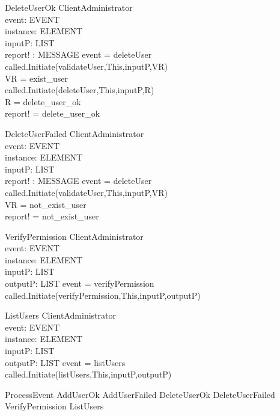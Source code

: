 \begin{schema}{DeleteUserOk}
\Delta ClientAdministrator \\
event: EVENT \\
instance: ELEMENT \\
inputP: LIST \\
report! : MESSAGE
\where event = deleteUser \\
called.Initiate(validateUser,This,inputP,VR) \\
VR = exist\_user \\
called.Initiate(deleteUser,This,inputP,R) \\
R = delete\_user\_ok \\
report! = delete\_user\_ok
\end{schema}

\begin{schema}{DeleteUserFailed}
\Delta ClientAdministrator \\
event: EVENT \\
instance: ELEMENT \\
inputP: LIST \\
report! : MESSAGE
\where event = deleteUser \\
called.Initiate(validateUser,This,inputP,VR) \\
VR = not\_exist\_user \\
report! = not\_exist\_user
\end{schema}

\begin{schema}{VerifyPermission}
\Delta ClientAdministrator \\
event: EVENT \\
instance: ELEMENT \\
inputP: LIST \\
outputP: LIST
\where event = verifyPermission \\
called.Initiate(verifyPermission,This,inputP,outputP)
\end{schema}


\begin{schema}{ListUsers}
\Delta ClientAdministrator \\
event: EVENT \\
instance: ELEMENT \\
inputP: LIST \\
outputP: LIST
\where event = listUsers \\
called.Initiate(listUsers,This,inputP,outputP)
\end{schema}

\begin{zed}
ProcessEvent 
             \sdef AddUserOk 
             \lor AddUserFailed 
             \lor DeleteUserOk 
             \lor DeleteUserFailed
             \lor VerifyPermission
             \lor ListUsers
\end{zed}